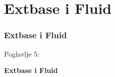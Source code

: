 %

\section{Extbase i Fluid}
\begin{frame}[fragile]
	\frametitle{Extbase i Fluid}

	\begin{center}\huge{Poglavlje 5:}\end{center}
	\begin{center}\huge{\color{typo3darkgrey}\textbf{Extbase i Fluid}}\end{center}

\end{frame}


